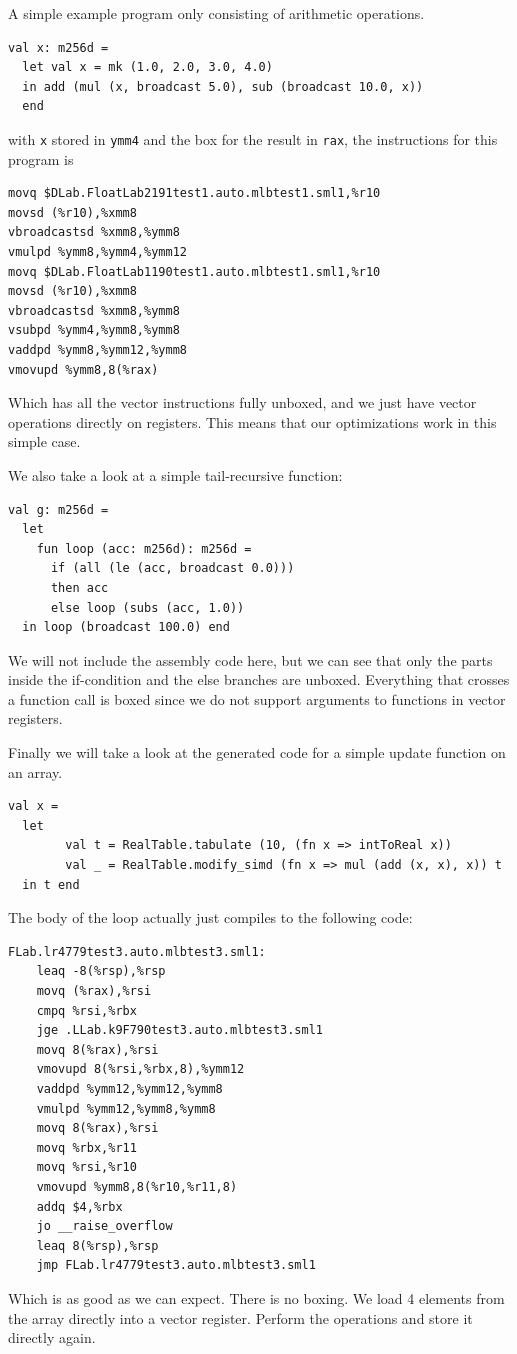\documentclass{article}
\begin{document}
A simple example program only consisting of arithmetic operations.
\begin{verbatim}
val x: m256d = 
  let val x = mk (1.0, 2.0, 3.0, 4.0)
  in add (mul (x, broadcast 5.0), sub (broadcast 10.0, x))
  end
\end{verbatim}
with \verb!x! stored in \verb!ymm4! and the box for the result in \verb!rax!, the instructions for this program is
\begin{verbatim}
movq $DLab.FloatLab2191test1.auto.mlbtest1.sml1,%r10
movsd (%r10),%xmm8
vbroadcastsd %xmm8,%ymm8
vmulpd %ymm8,%ymm4,%ymm12
movq $DLab.FloatLab1190test1.auto.mlbtest1.sml1,%r10
movsd (%r10),%xmm8
vbroadcastsd %xmm8,%ymm8
vsubpd %ymm4,%ymm8,%ymm8
vaddpd %ymm8,%ymm12,%ymm8
vmovupd %ymm8,8(%rax)
\end{verbatim}
Which has all the vector instructions fully unboxed, and we just have vector operations directly on registers. This means that our optimizations work in this simple case.

We also take a look at a simple tail-recursive function:
\begin{verbatim}
val g: m256d =
  let
    fun loop (acc: m256d): m256d =
      if (all (le (acc, broadcast 0.0)))
      then acc
      else loop (subs (acc, 1.0))
  in loop (broadcast 100.0) end
\end{verbatim}
We will not include the assembly code here, but we can see that only the parts inside the if-condition and the else branches are unboxed. Everything that crosses a function call is boxed since we do not support arguments to functions in vector registers.

Finally we will take a look at the generated code for a simple update function on an array.
\begin{verbatim}
val x =
  let
        val t = RealTable.tabulate (10, (fn x => intToReal x))
        val _ = RealTable.modify_simd (fn x => mul (add (x, x), x)) t
  in t end
\end{verbatim}
The body of the loop actually just compiles to the following code:
\begin{verbatim}
FLab.lr4779test3.auto.mlbtest3.sml1:
	leaq -8(%rsp),%rsp
	movq (%rax),%rsi
	cmpq %rsi,%rbx
	jge .LLab.k9F790test3.auto.mlbtest3.sml1
	movq 8(%rax),%rsi
	vmovupd 8(%rsi,%rbx,8),%ymm12
	vaddpd %ymm12,%ymm12,%ymm8
	vmulpd %ymm12,%ymm8,%ymm8
	movq 8(%rax),%rsi
	movq %rbx,%r11
	movq %rsi,%r10
	vmovupd %ymm8,8(%r10,%r11,8)
	addq $4,%rbx
	jo __raise_overflow
	leaq 8(%rsp),%rsp
	jmp FLab.lr4779test3.auto.mlbtest3.sml1
\end{verbatim}
Which is as good as we can expect. There is no boxing. We load 4 elements from the array directly into a vector register. Perform the operations and store it directly again.
\end{document}
